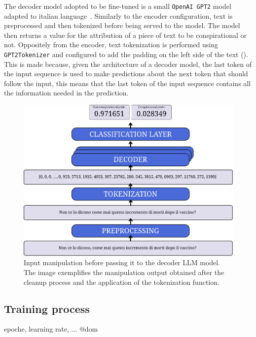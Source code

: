 \documentclass[11pt]{article}
\begin{document}
The decoder model adopted to be fine-tuned is a small \texttt{OpenAI GPT2} model adapted to italian language~\cite{de-vries-nissim-2021-good}.
%
Similarly to the encoder configuration, 
text is preprocessed and then tokenized before being served to the model.
%
The model then returns a value for the attribution of a piece of text to be conspirational or not.
%
Oppositely from the encoder, 
text tokenization is performed using \texttt{GPT2Tokenizer} 
and configured to add the padding on the left side of the text ().
%
This is made because, given the architecture of a decoder model, 
the last token of the input sequence is used to make predictions about the next token that should follow the input,
this means that the last token of the input sequence contains all the information needed in the prediction.
%
\begin{figure}
  \centering
  \includegraphics[width=\linewidth]{figures/decoder.pdf}
  \caption{
    Input manipulation before passing it to the decoder LLM model. 
    The image exemplifies the manipulation output obtained after the cleanup process and the application of the tokenization function.
  }
  \label{fig:preprocessing-and-tokenization-decoder}
\end{figure}

\subsection{Training process}\label{sec:training-process}
epoche, learning rate, ... @dom
\end{document}

